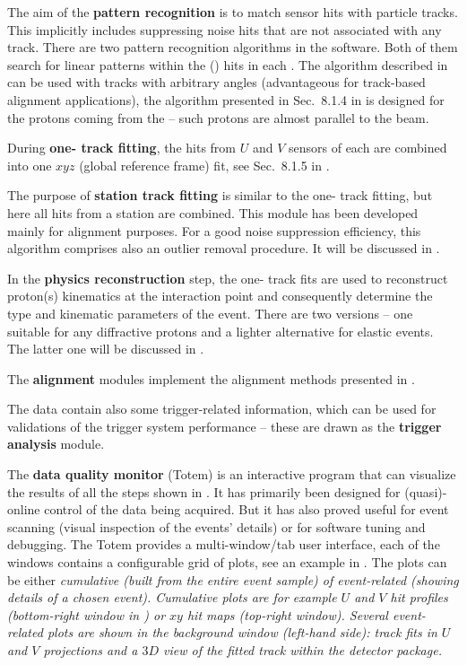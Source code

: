 \> The aim of the {\bf pattern recognition} is to match sensor hits with particle tracks. This implicitly includes suppressing noise hits that are not associated with any track. There are two pattern recognition algorithms in the  software. Both of them search for linear patterns within the () hits in each . The algorithm described in  can be used with tracks with arbitrary angles (advantageous for track-based alignment applications), the algorithm presented in Sec.~8.1.4 in  is designed for the protons coming from the  -- such protons are almost parallel to the beam.

\> During {\bf one- track fitting}, the hits from $U$ and $V$ sensors of each  are combined into one $xyz$ (global reference frame) fit, see Sec.~8.1.5 in .

\> The purpose of {\bf station track fitting} is similar to the one- track fitting, but here all hits from a station are combined. This module has been developed mainly for alignment purposes. For a good noise suppression efficiency, this algorithm comprises also an outlier removal procedure. It will be discussed in .

\> In the {\bf physics reconstruction} step, the one- track fits are used to reconstruct proton(s) kinematics at the interaction point and consequently determine the type and kinematic parameters of the event. There are two versions -- one suitable for any diffractive protons and a lighter alternative for elastic events. The latter one will be discussed in .

\> The {\bf alignment} modules implement the  alignment methods presented in .

\> The  data contain also some trigger-related information, which can be used for validations of the trigger system performance -- these are drawn as the {\bf trigger analysis} module.

\> The {\bf data quality monitor} (Totem) is an interactive program that can visualize the results of all the steps shown in . It has primarily been designed for (quasi)-online control of the data being acquired. But it has also proved useful for event scanning (visual inspection of the events' details) or for software tuning and debugging. The Totem  provides a multi-window/tab user interface, each of the windows contains a configurable grid of plots, see an example in . The plots can be either \em{cumulative} (built from the entire event sample) of \em{event-related} (showing details of a chosen event). Cumulative plots are for example $U$ and $V$ hit profiles (bottom-right window in ) or $xy$ hit maps (top-right window). Several event-related plots are shown in the background window (left-hand side): track fits in $U$ and $V$ projections and a $3D$ view of the fitted track within the detector package.

